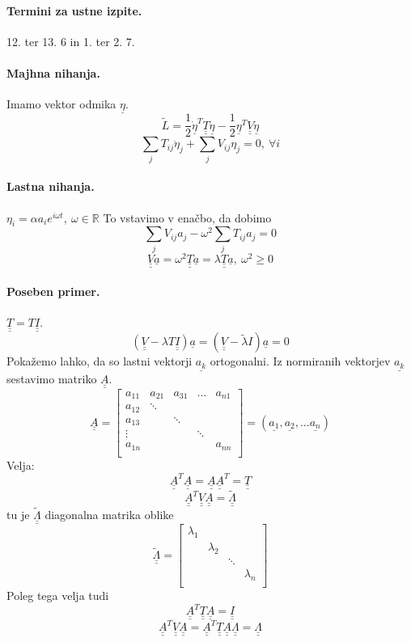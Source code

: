 \documentclass[a4paper]{article}
\newcommand{\R}{\mathbb{R}}
\newcommand{\duline}[1]{\underline{\underline{#1}}}
\begin{document}
\paragraph{Termini za ustne izpite.} 12. ter 13. 6 in 1. ter 2. 7.
\paragraph{Majhna nihanja.} Imamo vektor odmika $\underline{\eta}$.
$$\tilde{L} = \frac{1}{2}\dot{\underline{\eta}}^T\duline{T}\dot{\underline{\eta}} - \frac{1}{2}\underline{\eta}^T\duline{V}\underline{\eta}$$
$$\sum_j T_{ij}\ddot\eta_j + \sum_j V_{ij}\eta_j = 0,~\forall i$$
\paragraph{Lastna nihanja.} $\eta_i = \alpha a_i e^{i\omega t},~\omega\in\R$
To vstavimo v enačbo, da dobimo
$$\sum_j V_{ij}a_j - \omega^2 \sum_j T_{ij}a_j = 0$$
$$\duline{V}\underline{a} = \omega^2\duline{T}\underline{a} = \lambda\duline{T}\underline{a},~\omega^2 \geq 0$$
\paragraph{Poseben primer.} $\duline{T} = T\duline{I}$.
$$(\duline{V} - \lambda T \duline{I})\underline{a} = (\duline{V} - \tilde{\lambda} I)\underline{a} = 0$$
Pokažemo lahko, da so lastni vektorji $\underline{a_k}$ ortogonalni. Iz normiranih vektorjev $\underline{a_k}$ sestavimo matriko $\duline{A}$.
$$\duline{A} = \begin{bmatrix}
    a_{11} & a_{21} & a_{31} & \dots & a_{n1} \\
    a_{12} & \ddots &&& \\
    a_{13} && \ddots && \\
    \vdots &&& \ddots & \\
    a_{1n} &&&& a_{nn} \\
\end{bmatrix} = (\underline{a_1}, \underline{a_2}, ... \underline{a_n})$$
Velja:
$$\duline{A}^T\duline{A} = \duline{A}\duline{A}^T = \duline{T}$$
$$\duline{A}^T \duline{V} \duline{A} = \duline{\tilde{\Lambda}}$$
tu je $\duline{\tilde{\Lambda}}$ diagonalna matrika oblike
$$\duline{\tilde{\Lambda}} = \begin{bmatrix}
    \lambda_1 &&& \\
    & \lambda_2 && \\
    && \ddots & \\
    &&& \lambda_n \\
\end{bmatrix}$$
Poleg tega velja tudi
$$\duline{A}^T \duline{T} \duline{A} = \duline{I}$$
$$\duline{A}^T \duline{V}\duline{A} = \duline{A}^T\duline{T}\duline{A}\duline{\Lambda} = \duline{\Lambda}$$
\end{document}
